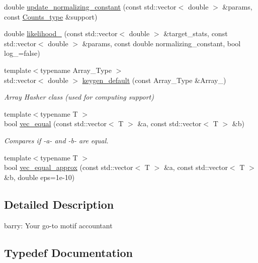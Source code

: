 \begin{DoxyCompactItemize}
\item 
double \hyperlink{namespacebarry_a822db820c95822d0e7a51728d9b9858d}{update\+\_\+normalizing\+\_\+constant} (const std\+::vector$<$ double $>$ \&params, const \hyperlink{namespacebarry_a3e2d8c3b6cf602107559d4237d9f1315}{Counts\+\_\+type} \&support)
\item 
double \hyperlink{namespacebarry_a1dcc0a46544cc9733ca8ee5619ef6d20}{likelihood\+\_\+} (const std\+::vector$<$ double $>$ \&target\+\_\+stats, const std\+::vector$<$ double $>$ \&params, const double normalizing\+\_\+constant, bool log\+\_\+=false)
\item 
{\footnotesize template$<$typename Array\+\_\+\+Type $>$ }\\std\+::vector$<$ double $>$ \hyperlink{namespacebarry_a22bfc7c4a1f5b5922edfd1101b8ffe3d}{keygen\+\_\+default} (const Array\+\_\+\+Type \&Array\+\_\+)
\begin{DoxyCompactList}\small\item\em Array Hasher class (used for computing support) \end{DoxyCompactList}\end{DoxyCompactItemize}
\textbf{ }\par
\begin{DoxyCompactItemize}
\item 
{\footnotesize template$<$typename T $>$ }\\bool \hyperlink{namespacebarry_afbdb85734a7793890ea4268ea114858e}{vec\+\_\+equal} (const std\+::vector$<$ T $>$ \&a, const std\+::vector$<$ T $>$ \&b)
\begin{DoxyCompactList}\small\item\em Compares if -\/a-\/ and -\/b-\/ are equal. \end{DoxyCompactList}\item 
{\footnotesize template$<$typename T $>$ }\\bool \hyperlink{namespacebarry_a24c4bd4a99dd82edf66c2d3b645dca08}{vec\+\_\+equal\+\_\+approx} (const std\+::vector$<$ T $>$ \&a, const std\+::vector$<$ T $>$ \&b, double eps=1e-\/10)
\end{DoxyCompactItemize}



\subsection{Detailed Description}
barry\+: Your go-\/to motif accountant 

\subsection{Typedef Documentation}
\mbox{\label{namespacebarry_ac328592ccff774bb3614f2cae43cffd7}} 

